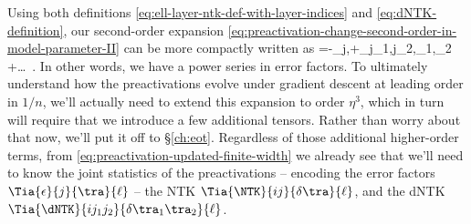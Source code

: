 Using both definitions \eqref{eq:ell-layer-ntk-def-with-layer-indices} and \eqref{eq:dNTK-definition},  
our second-order expansion \eqref{eq:preactivation-change-second-order-in-model-parameter-II} can be more compactly written as
\be\label{eq:preactivation-updated-finite-width}
=-\eta\sum_{j,\tra}+\sum_{j_1,j_2,\tra_1,\tra_2}  +\ldots\, .
\ee
In other words, we have a power series in error factors. To ultimately understand how the preactivations evolve under gradient descent  at leading order in $1/n$, we'll actually need to extend this expansion to order $\eta^3$, which in turn will require that we introduce a few additional tensors. Rather than worry about that now, we'll put it off to \S\ref{ch:eot}. Regardless of those additional higher-order terms, from \eqref{eq:preactivation-updated-finite-width} we already see that we'll need to know the joint statistics of the preactivations -- encoding the error factors $\Tia{\epsilon}{j}{\tra}{\ell}$ -- the NTK $\Tia{\NTK}{ij}{\delta\tra}{\ell}$, and the dNTK $\Tia{\dNTK}{i j_1j_2}{\delta\tra_1\tra_2}{\ell}$.



















